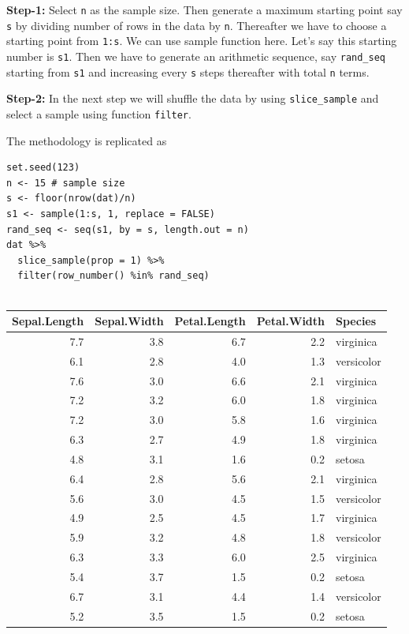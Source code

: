 \documentclass[
]{book}
\begin{document}
\textbf{Step-1:} Select \texttt{n} as the sample size. Then generate a maximum starting point say \texttt{s} by dividing number of rows in the data by \texttt{n}. Thereafter we have to choose a starting point from \texttt{1:s}. We can use sample function here. Let's say this starting number is \texttt{s1}. Then we have to generate an arithmetic sequence, say \texttt{rand\_seq} starting from \texttt{s1} and increasing every \texttt{s} steps thereafter with total \texttt{n} terms.

\textbf{Step-2:} In the next step we will shuffle the data by using \texttt{slice\_sample} and select a sample using function \texttt{filter}.

The methodology is replicated as

\begin{verbatim}
set.seed(123)
n <- 15 # sample size
s <- floor(nrow(dat)/n)
s1 <- sample(1:s, 1, replace = FALSE)
rand_seq <- seq(s1, by = s, length.out = n)
dat %>% 
  slice_sample(prop = 1) %>% 
  filter(row_number() %in% rand_seq)
  
\end{verbatim}

\begin{tabular}{r|r|r|r|l}
\hline
Sepal.Length & Sepal.Width & Petal.Length & Petal.Width & Species\\
\hline
7.7 & 3.8 & 6.7 & 2.2 & virginica\\
\hline
6.1 & 2.8 & 4.0 & 1.3 & versicolor\\
\hline
7.6 & 3.0 & 6.6 & 2.1 & virginica\\
\hline
7.2 & 3.2 & 6.0 & 1.8 & virginica\\
\hline
7.2 & 3.0 & 5.8 & 1.6 & virginica\\
\hline
6.3 & 2.7 & 4.9 & 1.8 & virginica\\
\hline
4.8 & 3.1 & 1.6 & 0.2 & setosa\\
\hline
6.4 & 2.8 & 5.6 & 2.1 & virginica\\
\hline
5.6 & 3.0 & 4.5 & 1.5 & versicolor\\
\hline
4.9 & 2.5 & 4.5 & 1.7 & virginica\\
\hline
5.9 & 3.2 & 4.8 & 1.8 & versicolor\\
\hline
6.3 & 3.3 & 6.0 & 2.5 & virginica\\
\hline
5.4 & 3.7 & 1.5 & 0.2 & setosa\\
\hline
6.7 & 3.1 & 4.4 & 1.4 & versicolor\\
\hline
5.2 & 3.5 & 1.5 & 0.2 & setosa\\
\hline
\end{tabular}
\end{document}
